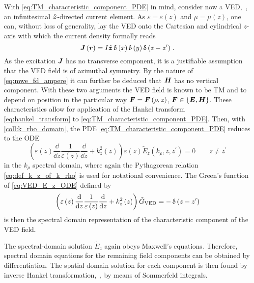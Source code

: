 With \eqref{eq:TM_characteristic_component_PDE} in mind, consider now 
a \ac{VED},~\ie, an infinitesimal $\uv{z}$-directed current element.
As $\varepsilon = \varepsilon\left(z\right)$ and $\mu = \mu\left(z\right)$,
one can, without loss of generality, lay the \ac{VED} onto the Cartesian
and cylindrical $z$-axis with which the current density formally reads
\begin{equation}\label{eq:VED_current_density}
	\pvec{J} \left(\pvec{r}\right) =
	I \uv{z}
	\diracDelta\left(x\right)
	\diracDelta\left(y\right)
	\diracDelta\left(z - z^\prime\right)
	\, .
\end{equation}
As the excitation $\pvec{J}$ has no transverse component, it is a justifiable
assumption that the \ac{VED} field is of azimuthal symmetry.
By the nature of \eqref{eq:mwe_fd_ampere} it can further be deduced that
$\pvec{H}$ has no vertical component.
With these two arguments the \ac{VED} field is known to be \ac{TM} and to depend
on position in the particular way
$\pvec{F} = \pvec{F} \left(\rho, z\right)$,
$\pvec{F} \in \left\{\pvec{E}, \pvec{H}\right\}$.
These characteristics allow for application of the Hankel transform
\eqref{eq:hankel_transform} to \eqref{eq:TM_characteristic_component_PDE}.
Then, with \cref{coll:k_rho_domain}, the \ac{PDE}
\eqref{eq:TM_characteristic_component_PDE} reduces to the \ac{ODE}
\begin{equation}\label{eq:VED_E_z_ODE}
	\left(
		\varepsilon \left(z\right)
		\frac{\dd}{\dd z}
		\frac{1}{\varepsilon \left(z\right)}
		\frac{\dd}{\dd z}
		+
		k_z^2 \left(z\right)
	\right)
	\varepsilon \left(z\right)
	\tilde{E}_z \left(k_\rho, z, z^\prime\right) = 0
	\qquad
	z \neq z^\prime
\end{equation}
in the $k_\rho$ spectral domain, where again the Pythagorean relation
\eqref{eq:def_k_z_of_k_rho} is used for notational convenience.
The Green's function of \eqref{eq:VED_E_z_ODE} defined by
\begin{equation}\label{eq:VED_E_z_ODE_greens_function_def}
	\left(
		\varepsilon \left(z\right)
		\frac{\mathrm{d}}{\mathrm{d} z}
		\frac{1}{\varepsilon \left(z\right)}
		\frac{\mathrm{d}}{\mathrm{d} z}
		+
		k_z^2 \left(z\right)
	\right)
	\tilde{G}_\mathrm{VED}
	=
	-\operatorname{\updelta} \left( z - z^\prime \right)
\end{equation}
is then the spectral domain representation of the characteristic component of
the \ac{VED} field.

The spectral-domain solution $\tilde{E}_z$ again obeys Maxwell's equations.
Therefore, spectral domain equations for the remaining field components can be
obtained by differentiation.
The spatial domain solution for each component is then found by inverse Hankel
transformation,~\ie, by means of Sommerfeld integrals.






